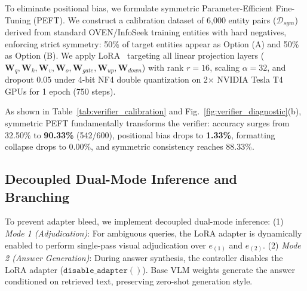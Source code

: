 \documentclass[conference]{IEEEtran}
\begin{document}
\begin{table}[!htbp]
\caption{Verifier Calibration Benchmark: Zero-Shot Foundation VLM vs. Calibrated Symmetric LoRA Verifier}
\label{tab:verifier_calibration}
\centering
{}
\end{table}

To eliminate positional bias, we formulate symmetric Parameter-Efficient Fine-Tuning (PEFT). We construct a calibration dataset of 6,000 entity pairs ($\mathcal{D}_{sym}$) derived from standard OVEN/InfoSeek training entities with hard negatives, enforcing strict symmetry: 50\% of target entities appear as Option (A) and 50\% as Option (B). We apply LoRA~\cite{lora} targeting all linear projection layers ($\mathbf{W}_q, \mathbf{W}_k, \mathbf{W}_v, \mathbf{W}_o, \mathbf{W}_{gate}, \mathbf{W}_{up}, \mathbf{W}_{down}$) with rank $r=16$, scaling $\alpha=32$, and dropout $0.05$ under 4-bit NF4 double quantization on 2$\times$ NVIDIA Tesla T4 GPUs for 1 epoch (750 steps).

As shown in Table~\ref{tab:verifier_calibration} and Fig.~\ref{fig:verifier_diagnostic}(b), symmetric PEFT fundamentally transforms the verifier: accuracy surges from 32.50\% to \textbf{90.33\%} (542/600), positional bias drops to \textbf{1.33\%}, formatting collapse drops to 0.00\%, and symmetric consistency reaches 88.33\%.

\subsection{Decoupled Dual-Mode Inference and Branching}
To prevent adapter bleed, we implement decoupled dual-mode inference:
(1) \textit{Mode 1 (Adjudication)}: For ambiguous queries, the LoRA adapter is dynamically enabled to perform single-pass visual adjudication over $e_{(1)}$ and $e_{(2)}$.
(2) \textit{Mode 2 (Answer Generation)}: During answer synthesis, the controller disables the LoRA adapter ($\mathtt{disable\_adapter()}$). Base VLM weights generate the answer conditioned on retrieved text, preserving zero-shot generation style.
\end{document}
